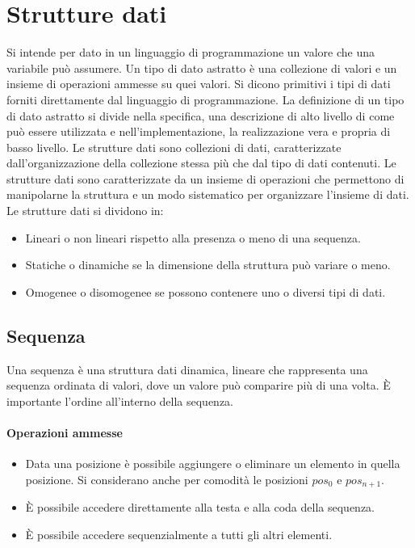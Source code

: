 \chapter{Strutture dati}
Si intende per dato in un linguaggio di programmazione un valore che una variabile pu\`o assumere. Un tipo di dato astratto \`e una collezione di valori e un
insieme di operazioni ammesse su quei valori. Si dicono primitivi i tipi di dati forniti direttamente dal linguaggio di programmazione. La definizione di un
tipo di dato astratto si divide nella specifica, una descrizione di alto livello di come pu\`o essere utilizzata e nell'implementazione, la realizzazione 
vera e propria di basso livello. Le strutture dati sono collezioni di dati, caratterizzate dall'organizzazione della collezione stessa pi\`u che dal tipo di
dati contenuti. Le strutture dati sono caratterizzate da un insieme di operazioni che permettono di manipolarne la struttura e un modo sistematico per 
organizzare l'insieme di dati. Le strutture dati si dividono in:
\begin{itemize}
\item Lineari o non lineari rispetto alla presenza o meno di una sequenza.
\item Statiche o dinamiche se la dimensione della struttura pu\`o variare o meno.
\item Omogenee o disomogenee se possono contenere uno o diversi tipi di dati.
\end{itemize}
\section{Sequenza}
Una sequenza \`e una struttura dati dinamica, lineare che rappresenta una sequenza ordinata di valori, dove un valore pu\`o comparire pi\`u di una volta. \`E
importante l'ordine all'interno della sequenza. 
\subsubsection{Operazioni ammesse}
\begin{itemize}
\item Data una posizione \`e possibile aggiungere o eliminare un elemento in quella posizione. Si considerano anche per comodit\`a le posizioni $pos_0$ e 
$pos_{n+1}$.
\item \`E possibile accedere direttamente alla testa e alla coda della sequenza.
\item \`E possibile accedere sequenzialmente a tutti gli altri elementi.
\end{itemize}
